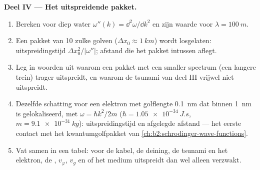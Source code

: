 \begin{problem}
\medskip
\noindent\textbf{Deel IV --- Het uitspreidende pakket.}
\begin{enumerate}[resume]
  \item Bereken voor diep water $\omega''(k) = \dd^2\omega/\dd k^2$ en zijn
        waarde voor $\lambda = \qty{100}{m}$.
  \item Een pakket van \qty{10}{} zulke golven
        ($\Delta x_0 \approx \qty{1}{km}$) wordt losgelaten:
        uitspreidingstijd $\Delta x_0^2/|\omega''|$; afstand die het pakket
        intussen aflegt.
  \item Leg in woorden uit waarom een pakket met een smaller spectrum (een
        langere trein) trager uitspreidt, en waarom de tsunami van deel III
        vrijwel niet uitspreidt.
  \item Dezelfde schatting voor een elektron met golflengte \qty{0.1}{nm}
        dat binnen \qty{1}{nm} is gelokaliseerd, met $\omega = \hbar k^2/2m$
        ($\hbar =
        \qty{1.05e-34}{J.s}$, $m = \qty{9.1e-31}{kg}$):
        uitspreidingstijd en afgelegde afstand --- het eerste contact met
        het kwantumgolfpakket van \cref{ch:b2:schrodinger-wave-functions}.
  \item Vat samen in een tabel: voor de kabel, de deining, de tsunami en het
        elektron, de , $v_\varphi$, $v_g$ en of het medium
        uitspreidt dan wel alleen verzwakt.
\end{enumerate}
\end{problem}
